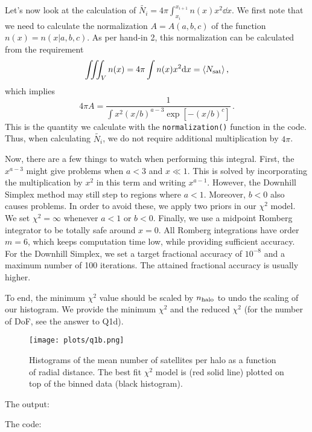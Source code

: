 Let's now look at the calculation of $\tilde{N_{i}} = 4 \pi \int_{x_{i}}^{x_{i+1}} n(x) x^{2} \dd x$. We first note that we need to calculate the
normalization $A = A(a,b,c)$ of the function $n(x) = n(x|a,b,c)$. As per hand-in 2, this normalization can be calculated from the requirement
\begin{equation}
    \iiint_{V} n(x) = 4 \pi \int n(x) x^{2} \mathrm{d} x = \langle N_{\rm sat} \rangle \, ,
\end{equation}
which implies
\begin{equation}
    4 \pi A = \frac{1}{\int x^2 (x/b)^{a-3} \exp \left[- (x/b)^{c} \right]} \, .
\end{equation}
This is the quantity we calculate with the \texttt{normalization()} function in the code. Thus, when calculating $\tilde{N_{i}}$, we do not
require additional multiplication by $4 \pi$.

Now, there are a few things to watch when performing this integral. First, the $x^{a - 3}$ might give problems when $a < 3$ and $x \ll 1$. 
This is solved by incorporating the multiplication by $x^2$ in this term and writing $x^{a - 1}$. However, the Downhill Simplex method may
still step to regions where $a < 1$. Moreover, $b < 0$ also causes problems. In order to avoid these, we apply two priors in our $\chi^2$ 
model. We set $\chi^2 = \infty$ whenever $a < 1$ or $b < 0$. Finally, we use a midpoint Romberg integrator to be totally safe around $x = 0$.
All Romberg integrations have order $m=6$, which keeps computation time low, while providing sufficient accuracy.
For the Downhill Simplex, we set a target fractional accuracy of $10^{-8}$ and a maximum number of 100 iterations. 
The attained fractional accuracy is usually higher.

To end, the minimum $\chi^2$ value should be scaled by $n_{\rm halo}$ to undo the scaling of our histogram. We provide the minimum $\chi^2$
and the reduced $\chi^2$ (for the number of DoF, see the answer to Q1d).

\begin{figure}[H]
    \centering
    \texttt{[image: plots/q1b.png]}
    \caption{Histograms of the mean number of satellites per halo as a function of radial distance. The best fit $\chi^{2}$ model is
    (red solid line) plotted on top of the binned data (black histogram).
    }
\end{figure}

\noindent The output:



\noindent The code:

